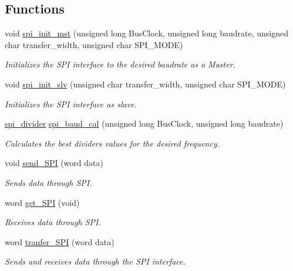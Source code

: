 \subsection*{Functions}
\begin{DoxyCompactItemize}
\item 
void \hyperlink{group___s_p_i_gab49ca6ed7d4337f79a4a46253a0bcc62}{spi\+\_\+init\+\_\+mst} (unsigned long Bus\+Clock, unsigned long baudrate, unsigned char transfer\+\_\+width, unsigned char S\+P\+I\+\_\+\+M\+O\+D\+E)
\begin{DoxyCompactList}\small\item\em Initializes the S\+P\+I interface to the desired baudrate as a Master. \end{DoxyCompactList}\item 
void \hyperlink{group___s_p_i_ga65cea3c951df80d515ad8de782eacdb8}{spi\+\_\+init\+\_\+slv} (unsigned char transfer\+\_\+width, unsigned char S\+P\+I\+\_\+\+M\+O\+D\+E)
\begin{DoxyCompactList}\small\item\em Initializes the S\+P\+I interface as slave. \end{DoxyCompactList}\item 
\hyperlink{structspi__divider}{spi\+\_\+divider} \hyperlink{group___s_p_i_ga1891ee7d4d812f998f290c9a1a65068b}{spi\+\_\+baud\+\_\+cal} (unsigned long Bus\+Clock, unsigned long baudrate)
\begin{DoxyCompactList}\small\item\em Calculates the best dividers values for the desired frequency. \end{DoxyCompactList}\item 
void \hyperlink{group___s_p_i_ga0ae24835498fe160774990423328cc41}{send\+\_\+\+S\+P\+I} (word data)
\begin{DoxyCompactList}\small\item\em Sends data through S\+P\+I. \end{DoxyCompactList}\item 
word \hyperlink{group___s_p_i_ga47ab469f1d05e31eab7814cab5123127}{get\+\_\+\+S\+P\+I} (void)
\begin{DoxyCompactList}\small\item\em Receives data through S\+P\+I. \end{DoxyCompactList}\item 
word \hyperlink{group___s_p_i_ga0161f7f2a3f5e77e2e71051bdfdcb856}{tranfer\+\_\+\+S\+P\+I} (word data)
\begin{DoxyCompactList}\small\item\em Sends and receives data through the S\+P\+I interface. \end{DoxyCompactList}\end{DoxyCompactItemize}


